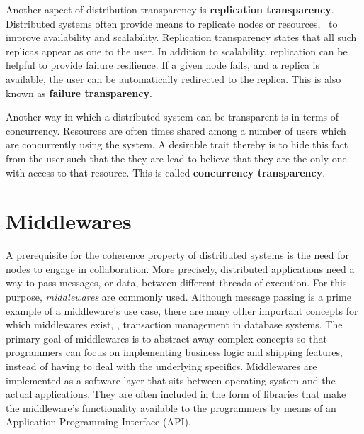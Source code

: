 Another aspect of distribution transparency is \textbf{replication transparency}. Distributed systems often provide means to replicate nodes or resources, \eg\ to improve availability and scalability. Replication transparency states that all such replicas appear as one to the user. In addition to scalability, replication can be helpful to provide failure resilience. If a given node fails, and a replica is available, the user can be automatically redirected to the replica. This is also known as \textbf{failure transparency}.

Another way in which a distributed system can be transparent is in terms of concurrency. Resources are often times shared among a number of users which are concurrently using the system. A desirable trait thereby is to hide this fact from the user such that the they are lead to believe that they are the only one with access to that resource. This is called \textbf{concurrency transparency}.


%
%
%
%
%
%
%
%
%
%

\section{Middlewares} \label{sec:middlewares}
A prerequisite for the coherence property of distributed systems is the need for nodes to engage in collaboration. More precisely, distributed applications need a way to pass messages, or data, between different threads of execution. For this purpose, \emph{middlewares} \cite{bernstein1996middleware} are commonly used. Although message passing is a prime example of a middleware's use case, there are many other important concepts for which middlewares exist, \eg , transaction management in database systems. The primary goal of middlewares is to abstract away complex concepts so that programmers can focus on implementing business logic and shipping features, instead of having to deal with the underlying specifics. Middlewares are implemented as a software layer that sits between operating system and the actual applications. They are often included in the form of libraries that make the middleware's functionality available to the programmers by means of an Application Programming Interface (API). 

